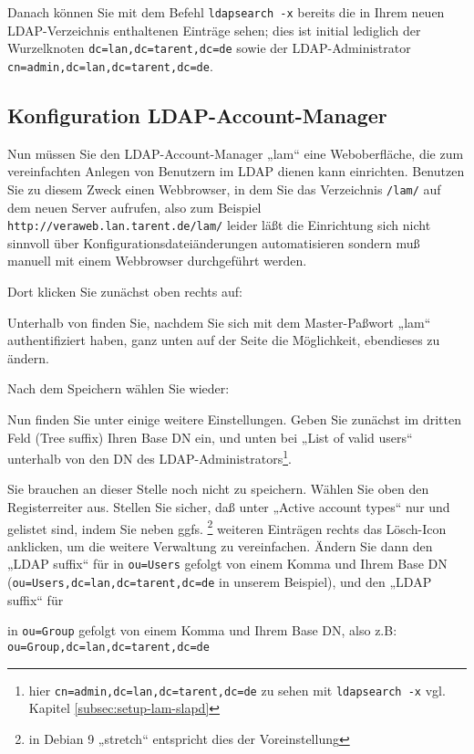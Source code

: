 \documentclass{tarentanleitung}
\begin{document}
Danach können Sie mit dem Befehl \texttt{ldapsearch -x} bereits die in
Ihrem neuen LDAP-Verzeichnis enthaltenen Einträge sehen; dies ist initial
lediglich der Wurzelknoten \texttt{dc=lan,dc=tarent,dc=de} sowie der
LDAP-Administrator \texttt{cn=admin,dc=lan,dc=tarent,dc=de}.

\subsection{Konfiguration LDAP-Account-Manager}\label{subsec:setup-lam-cfg}

Nun müssen Sie den LDAP-Account-Manager „lam“ \dash eine Weboberfläche,
die zum vereinfachten Anlegen von Benutzern im LDAP dienen kann \dash
einrichten. Benutzen Sie zu diesem Zweck einen Webbrowser, in dem Sie
das Verzeichnis \texttt{/lam/} auf dem neuen Server aufrufen, also zum
Beispiel \texttt{http://veraweb.lan.tarent.de/lam/} \dash leider läßt
die Einrichtung sich nicht sinnvoll über Konfigurationsdateiänderungen
automatisieren sondern muß manuell mit einem Webbrowser durchgeführt
werden.

Dort klicken Sie zunächst oben rechts auf:

Unterhalb von  finden
Sie, nachdem Sie sich mit dem Master-Paßwort „lam“ authentifiziert
haben, ganz unten auf der Seite die Möglichkeit, ebendieses zu ändern.

Nach dem Speichern wählen Sie wieder:

Nun finden Sie unter 
einige weitere Einstellungen. Geben Sie zunächst im dritten Feld
(Tree suffix) Ihren Base DN ein, und unten bei „List of valid users“
unterhalb von  den DN
des LDAP-Administrators\Hair\footnote{hier
\texttt{cn=admin,dc=lan,dc=tarent,dc=de} \dash zu sehen mit
\texttt{ldapsearch -x} \dash vgl. Kapitel \ref{subsec:setup-lam-slapd}}.

\strut Sie brauchen an dieser Stelle noch nicht zu speichern. Wählen Sie
oben den Registerreiter  aus. Stellen
Sie sicher, daß unter „Active account types“ nur 
und  gelistet sind, indem Sie neben ggfs.%
\Hair\footnote{\label{fn:vor9}in Debian 9 „stretch“ entspricht dies der
Voreinstellung} weiteren Einträgen rechts das Lösch-Icon 
anklicken, um die weitere Verwaltung zu vereinfachen. Ändern Sie dann den
„LDAP suffix“ für  in \texttt{ou=Users} gefolgt
von einem Komma und Ihrem Base DN (\texttt{ou=Users,dc=lan,dc=tarent,dc=de}
in unserem Beispiel), und den „LDAP suffix“ für 
\strut in \texttt{ou=Group} gefolgt von einem Komma und Ihrem Base DN, also
z.B: \texttt{ou=Group,dc=lan,dc=tarent,dc=de}\strut
\end{document}
